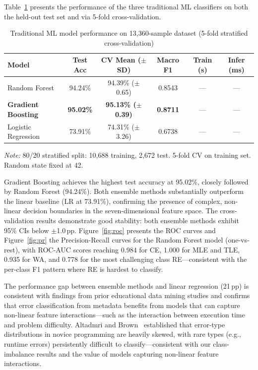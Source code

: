 \documentclass[10pt,a4paper]{article}
\begin{document}
Table~\ref{tab:ml-results} presents the performance of the three traditional
ML classifiers on both the held-out test set and via 5-fold cross-validation.

\begin{table}[htbp]
\centering
\caption{Traditional ML model performance on 13,360-sample dataset
         (5-fold stratified cross-validation)}
\label{tab:ml-results}
\begin{tabular}{@{}lccccc@{}}
\toprule
Model & Test Acc & CV Mean ($\pm$SD) & Macro F1 & Train (s) & Infer (ms) \\
\midrule
Random Forest       & 94.24\% & 94.39\% ($\pm$0.65) & 0.8543 & --- & --- \\
\textbf{Gradient Boosting}   & \textbf{95.02\%} & \textbf{95.13\% ($\pm$0.39)} & \textbf{0.8711} & --- & --- \\
Logistic Regression & 73.91\% & 74.31\% ($\pm$3.26) & 0.6738 & --- & --- \\
\bottomrule
\end{tabular}

\vspace{2mm}
{\small \textit{Note:} 80/20 stratified split: 10,688 training, 2,672 test.
5-fold CV on training set. Random state fixed at 42.}
\end{table}

Gradient Boosting achieves the highest test accuracy at 95.02\%, closely
followed by Random Forest (94.24\%). Both ensemble methods substantially
outperform the linear baseline (LR at 73.91\%), confirming the presence of
complex, non-linear decision boundaries in the seven-dimensional feature
space. The cross-validation results demonstrate good stability: both ensemble
methods exhibit 95\% CIs below $\pm$1.0\,pp.
Figure~\ref{fig:roc} presents the ROC curves and Figure~\ref{fig:pr} the
Precision-Recall curves for the Random Forest model (one-vs-rest), with
ROC-AUC scores reaching 0.984 for CE, 1.000 for MLE and TLE, 0.935 for WA,
and 0.778 for the most challenging class RE---consistent with the per-class F1
pattern where RE is hardest to classify.

The performance gap between ensemble methods and linear regression (21\,pp)
is consistent with findings from prior educational data mining studies
and confirms that error classification from metadata benefits from models
that can capture non-linear feature interactions---such as the interaction
between execution time and problem difficulty. Altadmri and Brown~\cite{altadmri2015most} established that error-type
distributions in novice programming are heavily skewed, with rare types
(e.g., runtime errors) persistently difficult to classify---consistent with
our class-imbalance results and the value of models capturing non-linear
feature interactions.
\end{document}
